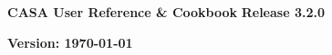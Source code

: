 \pagestyle{empty}

\begin{center}
\Huge
{\bf CASA User Reference \& Cookbook} 
\break 
\break 
\huge
{\bf Release 3.2.0}
\break 
\end{center}
\normalsize
\vspace{2.5cm}
\begin{figure}[h!]
\begin{center}
\end{center}
\end{figure}


\Large
\vfill
\begin{center}
{\bf Version: \today}
\end{center}
\normalsize

\pagebreak
